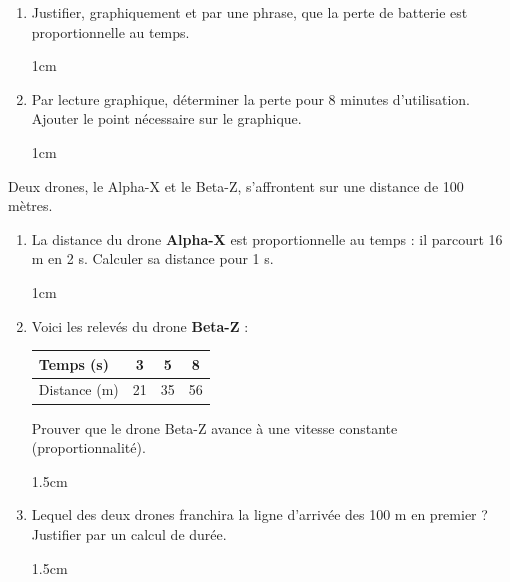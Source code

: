 \documentclass[a4paper]{book}
\begin{document}
{\begin{exercice}
\begin{enumerate}
            \item Justifier, graphiquement et par une phrase, que la perte de batterie est proportionnelle au temps.

            \begin{ZoneReponse}{1cm}\end{ZoneReponse}

            \item Par lecture graphique, déterminer la perte pour 8 minutes d'utilisation. Ajouter le point nécessaire sur le graphique.

            \begin{ZoneReponse}{1cm}\end{ZoneReponse}
        \end{enumerate}
    \end{exercice}


    \begin{exercice}
        Deux drones, le Alpha-X et le Beta-Z, s'affrontent sur une distance de 100 mètres.

        \begin{enumerate}
            \item La distance du drone \textbf{Alpha-X} est proportionnelle au temps : il parcourt 16 m en 2 s. Calculer sa distance pour 1 s.

            \begin{ZoneReponse}{1cm}\end{ZoneReponse}
            
            \item Voici les relevés du drone \textbf{Beta-Z} :
            \begin{center}
            \begin{tabular}{|l|c|c|c|}
            \hline
            Temps (s) & 3 & 5 & 8 \\ \hline
            Distance (m) & 21 & 35 & 56 \\ \hline
            \end{tabular}
            \end{center}
            Prouver que le drone Beta-Z avance à une vitesse constante (proportionnalité).

            \begin{ZoneReponse}{1.5cm}\end{ZoneReponse}
            
            \item Lequel des deux drones franchira la ligne d'arrivée des 100 m en premier ? Justifier par un calcul de durée.

            \begin{ZoneReponse}{1.5cm}\end{ZoneReponse}
        \end{enumerate}
    \end{exercice}

        
}
\end{document}
